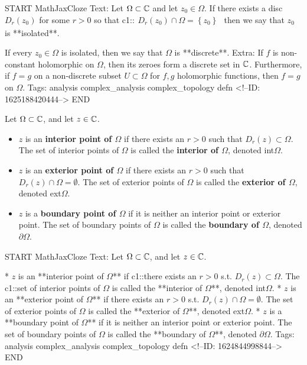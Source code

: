 \documentclass{memoir}
\begin{document}
\begin{anki}
START
MathJaxCloze
Text: Let \(\Omega \subset \mathbb{C}\) and let \(z_0 \in \Omega \). If there exists a disc \(D_{r}(z_0)\) for some \(r>0\) so that
 {{c1::\( \begin{align*}
        	 D_r(z_0) \cap \Omega = \left\{ z_0 \right\}
        \end{align*}\)}}
then we say that \(z_0\) is **isolated**.

If every \(z_0 \in \Omega \) is isolated, then we say that \(\Omega \) is **discrete**.
Extra: If \(f\) is non-constant holomorphic on \(\Omega \), then its zeroes form a discrete set in \(\mathbb{C}\). Furthermore, if \(f=g\) on a non-discrete subset \(U\subset \Omega \) for \(f,g\) holomorphic functions, then \(f=g\) on \(\Omega \).
Tags: analysis complex_analysis complex_topology defn
<!--ID: 1625188420444-->
END
\end{anki}


\begin{defn}
	Let \(\Omega \subset \mathbb{C}\), and let \(z \in \mathbb{C}\). 
	\begin{itemize}
		\item \(z\) is an \textbf{interior point of \(\Omega \)} if there exists an \(r>0\) such that \(D_r(z) \subset \Omega \). The set of interior points of \(\Omega\) is called the \textbf{interior of \(\Omega\)}, denoted \textrm{int}\(\Omega\).
	\item \(z\) is an \textbf{exterior point of \(\Omega\)} if there exists an \(r>0\) such that \(D_r(z) \cap \Omega = \emptyset\). The set of exterior points of \(\Omega\) is called the \textbf{exterior of \(\Omega\)}, denoted \textrm{ext}\(\Omega\).
	\item \(z\) is a \textbf{boundary point of \(\Omega\)} if it is neither an interior point or exterior point. The set of boundary points of \(\Omega\) is called the \textbf{boundary of \(\Omega\)}, denoted \(\partial \Omega\).
	\end{itemize}
\end{defn}

\begin{anki}
START
MathJaxCloze
Text: Let \(\Omega\subset \mathbb{C}\), and let \(z \in \mathbb{C}\). 

* \(z\) is an **interior point of \(\Omega\)** if {{c1::there exists an \(r>0\) s.t. \(D_r(z) \subset \Omega\)}}. The {{c1::set of interior points of \(\Omega\)}} is called the **interior of \(\Omega\)**, denoted \textrm{int}\(\Omega\).
* \(z\) is an **exterior point of \(\Omega\)** if there exists an \(r>0\) s.t. \(D_r(z) \cap \Omega = \emptyset\). The set of exterior points of \(\Omega\) is called the **exterior of \(\Omega\)**, denoted \textrm{ext}\(\Omega\).
* \(z\) is a **boundary point of \(\Omega\)** if it is neither an interior point or exterior point. The set of boundary points of \(\Omega\) is called the **boundary of \(\Omega\)**, denoted \(\partial \Omega\).
Tags: analysis complex_analysis complex_topology defn
<!--ID: 1624844998844-->
END
\end{anki}
\end{document}
